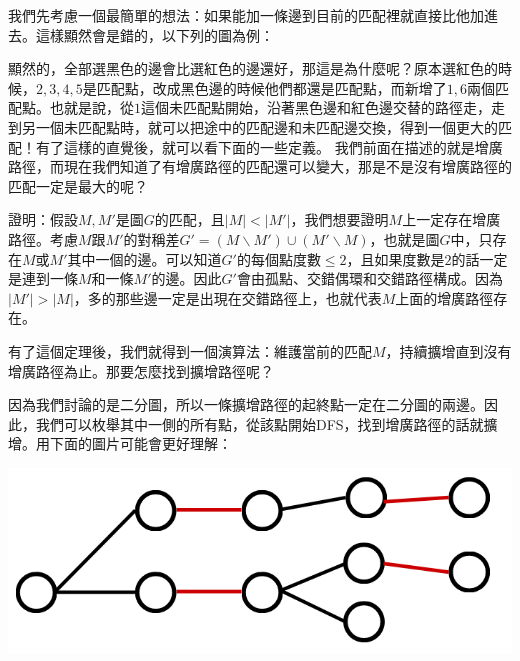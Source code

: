 \documentclass[main.tex]{subfiles}
\begin{document}
我們先考慮一個最簡單的想法：如果能加一條邊到目前的匹配裡就直接比他加進去。這樣顯然會是錯的，以下列的圖為例：
\begin{center}
\end{center}
\par 顯然的，全部選黑色的邊會比選紅色的邊還好，那這是為什麼呢？原本選紅色的時候，$2, 3, 4, 5$是匹配點，改成黑色邊的時候他們都還是匹配點，而新增了$1, 6$兩個匹配點。也就是說，從$1$這個未匹配點開始，沿著黑色邊和紅色邊交替的路徑走，走到另一個未匹配點時，就可以把途中的匹配邊和未匹配邊交換，得到一個更大的匹配！有了這樣的直覺後，就可以看下面的一些定義。
我們前面在描述的就是增廣路徑，而現在我們知道了有增廣路徑的匹配還可以變大，那是不是沒有增廣路徑的匹配一定是最大的呢？
\par 證明：假設$M, M'$是圖$G$的匹配，且$|M| < |M'|$，我們想要證明$M$上一定存在增廣路徑。考慮$M$跟$M'$的對稱差$G' = (M \backslash M') \cup (M' \backslash M)$，也就是圖$G$中，只存在$M$或$M'$其中一個的邊。可以知道$G'$的每個點度數$\leq 2$，且如果度數是$2$的話一定是連到一條$M$和一條$M'$的邊。因此$G'$會由孤點、交錯偶環和交錯路徑構成。因為$|M'| > |M|$，多的那些邊一定是出現在交錯路徑上，也就代表$M$上面的增廣路徑存在。
\par 有了這個定理後，我們就得到一個演算法：維護當前的匹配\(M\)，持續擴增直到沒有增廣路徑為止。那要怎麼找到擴增路徑呢？
\par 因為我們討論的是二分圖，所以一條擴增路徑的起終點一定在二分圖的兩邊。因此，我們可以枚舉其中一側的所有點，從該點開始DFS，找到增廣路徑的話就擴增。用下面的圖片可能會更好理解：
\begin{center}
\includegraphics[scale=0.3]{images/Matching/AlternatingTree.png}
\end{center}
\end{document}
